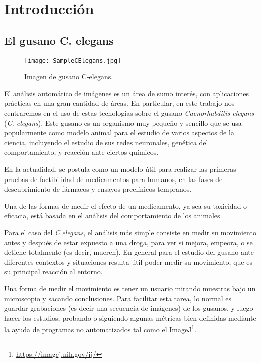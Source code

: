 \documentclass{article}
\begin{document}
\section{Introducción}

\subsection{El gusano C. elegans}

\begin{wrapfigure}{r}{0.4\textwidth}
\centering
    \texttt{[image: SampleCElegans.jpg]}
    \label{label 1}
    \caption{Imagen de gusano C-elegans.}
\end{wrapfigure}

El análisis automático de imágenes es un área de sumo interés, con aplicaciones prácticas en una gran cantidad de áreas. En particular, en este trabajo nos centraremos en el uso de estas tecnologías sobre el gusano \emph{Caenorhabditis elegans} (\emph{C. elegans}). Este gusano es un organismo muy pequeño y sencillo que se usa popularmente como modelo animal para el estudio de varios aspectos de la ciencia, incluyendo el estudio de sus redes neuronales\cite{NeuralElegans}, genética del comportamiento\cite{genetics}, y reacción ante ciertos químicos\cite{ChemicalElegans}.

En la actualidad, se postula como un modelo útil para realizar las primeras pruebas de factibilidad de medicamentos para
humanos, en las fases de descubrimiento de fármacos y ensayos preclínicos tempranos.

Una de las formas de medir el efecto de un medicamento, ya sea
su toxicidad o eficacia,  está basada en el análisis del comportamiento de los animales.

Para el caso del \emph{C.elegans}, el análisis más simple consiste en medir su movimiento antes y después de estar expuesto a una droga, para ver si mejora, empeora, o se detiene totalmente (es decir, mueren). En general para el estudio del gusano ante diferentes contextos y situaciones resulta útil poder medir su movimiento, que es su principal reacción al entorno.

Una forma de medir el movimiento es tener un usuario mirando muestras bajo un microscopio y sacando conclusiones. Para facilitar esta tarea, lo normal es guardar grabaciones (es decir una secuencia de imágenes) de los gusanos, y luego hacer los estudios, probando o siguiendo algunas métricas bien definidas mediante la ayuda de programas no automatizados tal como el ImageJ\footnote{\url{https://imagej.nih.gov/ij/}}.
\end{document}
